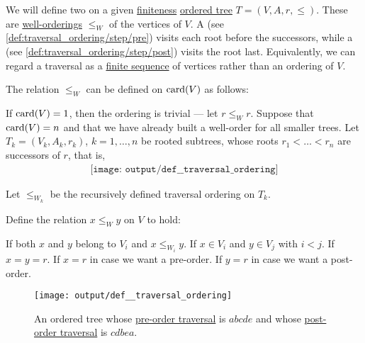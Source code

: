 \begin{definition}\label{def:traversal_ordering}
  We will define two  on a given \hyperref[def:set_finiteness]{finiteness} \hyperref[def:ordered_tree]{ordered tree} \( T = (V, A, r, \leq) \). These are \hyperref[def:well_ordered_set]{well-orderings} \( \leq_W \) of the vertices of \( V \). A  (see \ref{def:traversal_ordering/step/pre}) visits each root before the successors, while a  (see \ref{def:traversal_ordering/step/post}) visits the root last. Equivalently, we can regard a traversal as a \hyperref[def:sequence]{finite sequence} of vertices rather than an ordering of \( V \).

  The relation \( \leq_W \) can be defined on \( \operatorname{card}(V) \) as follows:
  \begin{thmenum}
     If \( \operatorname{card}(V) = 1 \), then the ordering is trivial --- let \( r \leq_W r \).
     Suppose that \( \operatorname{card}(V) = n \) and that we have already built a well-order for all smaller trees. Let \( T_k = (V_k, A_k, r_k) \), \( k = 1, \ldots, n \) be rooted subtrees, whose roots \( r_1 < \ldots < r_n \) are successors of \( r \), that is,
    \begin{equation*}
      \begin{aligned}
        \texttt{[image: output/def\_\_traversal\_ordering]}
      \end{aligned}
    \end{equation*}

    Let \( \leq_{W_k} \) be the recursively defined traversal ordering on \( T_k \).

    Define the relation \( x \leq_W y \) on \( V \) to hold:
    \begin{thmenum}
       If both \( x \) and \( y \) belong to \( V_i \) and \( x \leq_{W_i} y \).
       If \( x \in V_i \) and \( y \in V_j \) with \( i < j \).
       If \( x = y = r \).
       If \( x = r \) in case we want a pre-order.
       If \( y = r \) in case we want a post-order.
    \end{thmenum}
  \end{thmenum}

  \begin{figure}[!ht]
    \centering
    \texttt{[image: output/def\_\_traversal\_ordering]}
    \caption{An ordered tree whose \hyperref[def:traversal_ordering]{pre-order traversal} is \( abcde \) and whose \hyperref[def:traversal_ordering]{post-order traversal} is \( cdbea \).}
    \label{fig:def:traversal_ordering}
  \end{figure}
\end{definition}
